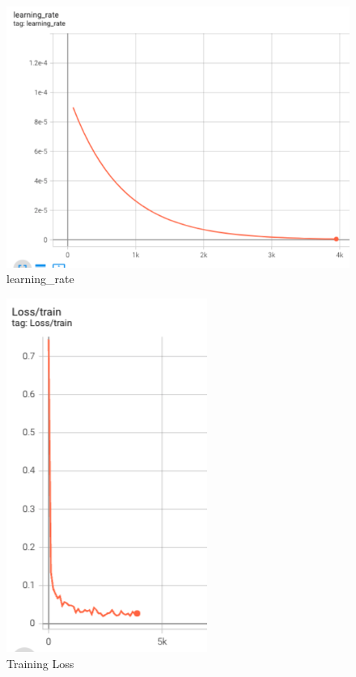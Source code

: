 \documentclass[11pt,addpoints,answers]{exam}
\numberwithin{equation}{section} %
\numberwithin{figure}{section} %
\numberwithin{table}{section} %
\begin{document}
\begin{itemize}
\begin{figure}[H]
\centering
\includegraphics[scale=0.5]{./results/q2/learning_rate.png}
\caption{learning\_rate}
\label{fig:q2_learning_rate}
\end{figure}

\begin{figure}[H]
\centering
\includegraphics[scale=0.5]{./results/q2/loss.png}
\caption{Training Loss}
\label{fig:q2_training_loss}
\end{figure}


\end{itemize}
\end{document}
